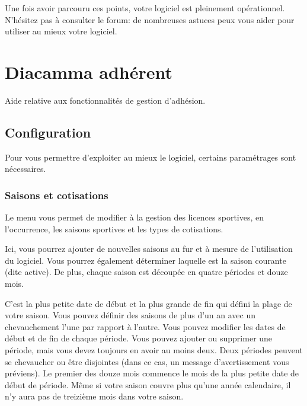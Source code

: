 \documentclass[a4paper,10pt,oneside,french]{sphinxmanual}
\begin{document}
Une fois avoir parcouru ces points, votre logiciel  est pleinement opérationnel.
N’hésitez pas à consulter le forum: de nombreuses astuces peux vous aider pour utiliser au mieux votre logiciel.


\chapter{Diacamma adhérent}
\label{\detokenize{member/index:diacamma-adherent}}\label{\detokenize{member/index::doc}}
Aide relative aux fonctionnalités de gestion d’adhésion.


\section{Configuration}
\label{\detokenize{member/config::doc}}\label{\detokenize{member/config:configuration}}
Pour vous permettre d’exploiter au mieux le logiciel, certains paramétrages sont nécessaires.


\subsection{Saisons et cotisations}
\label{\detokenize{member/config:saisons-et-cotisations}}
Le menu  vous permet de modifier à la gestion des licences sportives, en l’occurrence, les saisons sportives et les types de cotisations.

\begin{quote}

\noindent{}
\end{quote}

Ici, vous pourrez ajouter de nouvelles saisons au fur et à mesure de l’utilisation du logiciel. Vous pourrez également déterminer laquelle est la saison courante (dite active).
De plus, chaque saison est découpée en quatre périodes et douze mois.

C’est la plus petite date de début et la plus grande de fin qui défini la plage de votre saison. Vous pouvez définir des saisons de plus d’un an avec un chevauchement l’une par rapport à l’autre.
Vous pouvez modifier les dates de début et de fin de chaque période. Vous pouvez ajouter ou supprimer une période, mais vous devez toujours en avoir au moins deux.
Deux périodes peuvent se chevaucher ou être disjointes (dans ce cas, un message d’avertissement vous préviens).
Le premier des douze mois commence le mois de la plus petite date de début de période. Même si votre saison couvre plus qu’une année calendaire, il n’y aura pas de treizième mois dans votre saison.
\end{document}
